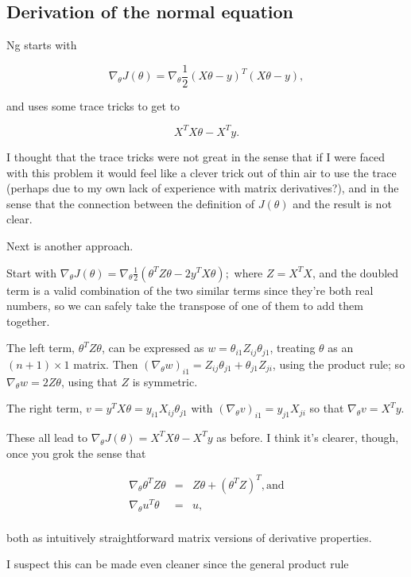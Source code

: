 \documentclass[]{article}
\begin{document}
\subsection{Derivation of the normal
equation}\label{derivation-of-the-normal-equation}

Ng starts with

\[\nabla_\theta J(\theta) = \nabla_\theta\frac{1}{2}(X\theta-y)^T(X\theta-y),\]

and uses some trace tricks to get to

\[X^TX\theta - X^Ty.\]

I thought that the trace tricks were not great in the sense that if I
were faced with this problem it would feel like a clever trick out of
thin air to use the trace (perhaps due to my own lack of experience with
matrix derivatives?), and in the sense that the connection between the
definition of \(J(\theta)\) and the result is not clear.

Next is another approach.

Start with
\(\nabla_\theta J(\theta) = \nabla_\theta \frac{1}{2}(\theta^TZ\theta - 2y^TX\theta);\)
where \(Z=X^TX\), and the doubled term is a valid combination of the two
similar terms since they're both real numbers, so we can safely take the
transpose of one of them to add them together.

\newcommand{\nt}{\nabla_\theta}

The left term, \(\theta^T Z\theta\), can be expressed as
\(w=\theta_{i1}Z_{ij}\theta_{j1}\), treating \(\theta\) as an
\((n+1)\times 1\) matrix. Then
\((\nt w)_{i1} = Z_{ij}\theta_{j1} + \theta_{j1}Z_{ji}\), using the
product rule; so \(\nt w = 2Z\theta\), using that \(Z\) is symmetric.

The right term, \(v = y^TX\theta = y_{i1}X_{ij}\theta_{j1}\) with
\((\nt v)_{i1} = y_{j1}X_{ji}\) so that \(\nt v = X^Ty\).

These all lead to \(\nt J(\theta) = X^TX\theta - X^Ty\) as before. I
think it's clearer, though, once you grok the sense that

\[\begin{array}{rcl}
\nt \theta^TZ\theta & = & Z\theta + (\theta^T Z)^T, \text{and} \\
\nt u^T\theta & = & u, \\
\end{array}\]

both as intuitively straightforward matrix versions of derivative
properties.

I suspect this can be made even cleaner since the general product rule
\end{document}
